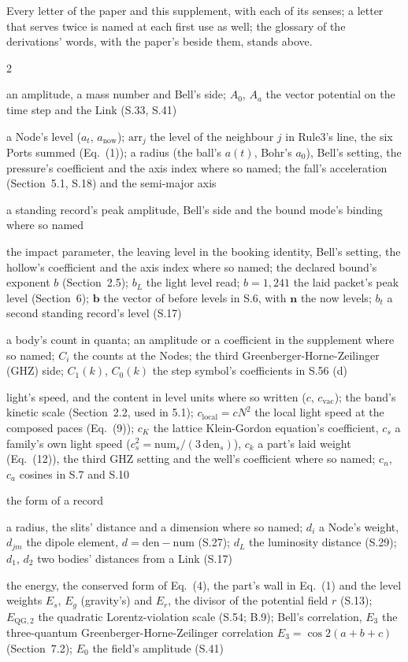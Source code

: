 \documentclass[pdflatex,sn-mathphys-num]{sn-jnl}
\newcommand{\num}{\mathrm{num}}
\newcommand{\den}{\mathrm{den}}
\newcommand{\nom}[2]{\item[{#1}] #2}
\theoremstyle{thmstyleone}
\begin{document}
Every letter of the paper and this supplement, with each of its senses; a letter that serves twice is named at each first use as well; the glossary of the derivations' words, with the paper's beside them, stands above.
\begin{multicols}{2}\small\begin{description}[style=unboxed,leftmargin=0pt,itemsep=0pt,parsep=0pt,font=\normalfont]
\nom{$A$}{an amplitude, a mass number and Bell's side; $A_0$, $A_a$ the vector potential on the time step and the Link (S.33, S.41)}
\nom{$a$}{a Node's level ($a_t$, $a_{\mathrm{now}}$); $\mathrm{arr}_j$ the level of the neighbour $j$ in Rule3's line, the six Ports summed (Eq.~(1)); a radius (the ball's $a(t)$, Bohr's $a_0$), Bell's setting, the pressure's coefficient and the axis index where so named; the fall's acceleration (Section~5.1, S.18) and the semi-major axis}
\nom{$B$}{a standing record's peak amplitude, Bell's side and the bound mode's binding where so named}
\nom{$b$}{the impact parameter, the leaving level in the booking identity, Bell's setting, the hollow's coefficient and the axis index where so named; the declared bound's exponent $b$ (Section~2.5); $b_L$ the light level read; $b = 1{,}241$ the laid packet's peak level (Section~6); $\mathbf b$ the vector of before levels in S.6, with $\mathbf n$ the now levels; $b_t$ a second standing record's level (S.17)}
\nom{$C$}{a body's count in quanta; an amplitude or a coefficient in the supplement where so named; $C_i$ the counts at the Nodes; the third Greenberger-Horne-Zeilinger (GHZ) side; $C_1(k)$, $C_0(k)$ the step symbol's coefficients in S.56 (d)}
\nom{$c$, $c_m$}{light's speed, and the content in level units where so written ($c$, $c_{\mathrm{vac}}$); the band's kinetic scale (Section~2.2, used in 5.1); $c_{\mathrm{local}} = cN^2$ the local light speed at the composed paces (Eq.~(9)); $c_K$ the lattice Klein-Gordon equation's coefficient, $c_s$ a family's own light speed ($c_s^2 = \num_s / (3\,\den_s)$), $c_k$ a part's laid weight (Eq.~(12)), the third GHZ setting and the well's coefficient where so named; $c_n$, $c_a$ cosines in S.7 and S.10}
\nom{$D$}{the form of a record}
\nom{$d$}{a radius, the slits' distance and a dimension where so named; $d_i$ a Node's weight, $d_{jm}$ the dipole element, $d = \den - \num$ (S.27); $d_L$ the luminosity distance (S.29); $d_1$, $d_2$ two bodies' distances from a Link (S.17)}
\nom{$E$, $E(a, b)$}{the energy, the conserved form of Eq.~(4), the part's wall in Eq.~(1) and the level weights $E_s$, $E_g$ (gravity's) and $E_r$, the divisor of the potential field $r$ (S.13); $E_{\mathrm{QG},2}$ the quadratic Lorentz-violation scale (S.54; B.9); Bell's correlation, $E_3$ the three-quantum Greenberger-Horne-Zeilinger correlation $E_3 = \cos 2(a + b + c)$ (Section~7.2); $E_0$ the field's amplitude (S.41)}

\end{description}
\end{multicols}
\end{document}
